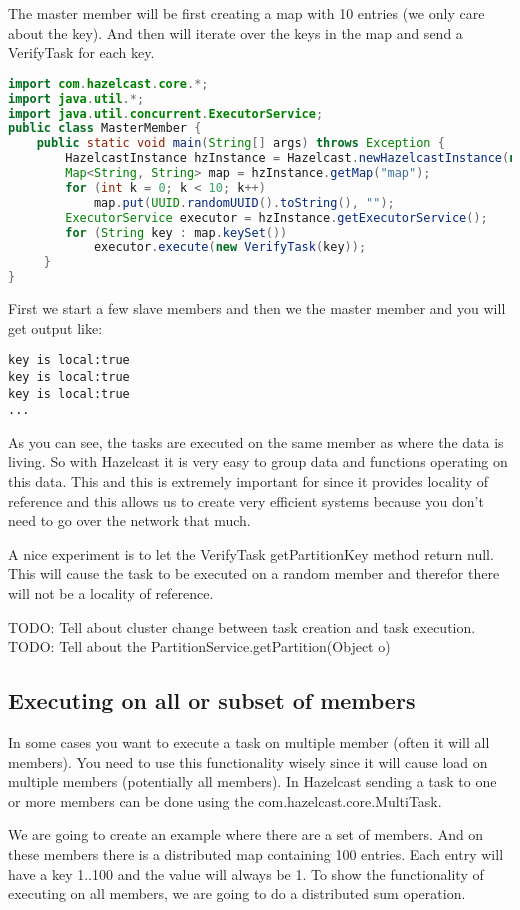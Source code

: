 The master member will be first creating a map with 10 entries (we only care about the key). And then will iterate over the keys in the map and send a VerifyTask for each key. 
\begin{lstlisting}[language=java]
import com.hazelcast.core.*;
import java.util.*;
import java.util.concurrent.ExecutorService;
public class MasterMember {
    public static void main(String[] args) throws Exception {
        HazelcastInstance hzInstance = Hazelcast.newHazelcastInstance(null);
        Map<String, String> map = hzInstance.getMap("map");
        for (int k = 0; k < 10; k++) 
            map.put(UUID.randomUUID().toString(), "");
        ExecutorService executor = hzInstance.getExecutorService();
        for (String key : map.keySet()) 
            executor.execute(new VerifyTask(key));
     }
}
\end{lstlisting}
First we start a few slave members and then we the master member and you will get output like:
\begin{lstlisting}
key is local:true
key is local:true
key is local:true
...
\end{lstlisting}
As you can see, the tasks are executed on the same member as where the data is living. So with Hazelcast it is very easy to group data and functions operating on this data. This  and this is extremely important for since it provides locality of reference and this allows us to create very efficient systems because you don't need to go over the network that much.

A nice experiment is to let the VerifyTask getPartitionKey method return null. This will cause the task to be executed on a random member and therefor there will not be a locality of reference.

TODO: Tell about cluster change between task creation and task execution.
TODO: Tell about the PartitionService.getPartition(Object o)

\subsection{Executing on all or subset of members}
In some cases you want to execute a task on multiple member (often it will all members). You need to use this functionality wisely since it will cause load on multiple members (potentially all members). In Hazelcast sending a task to one or more members can be done using the com.hazelcast.core.MultiTask.

We are going to create an example where there are a set of members. And on these members there is a distributed map containing 100 entries. Each entry will have a key 1..100 and the value will always be 1. To show the functionality of executing on all members, we are going to do a distributed sum operation.

